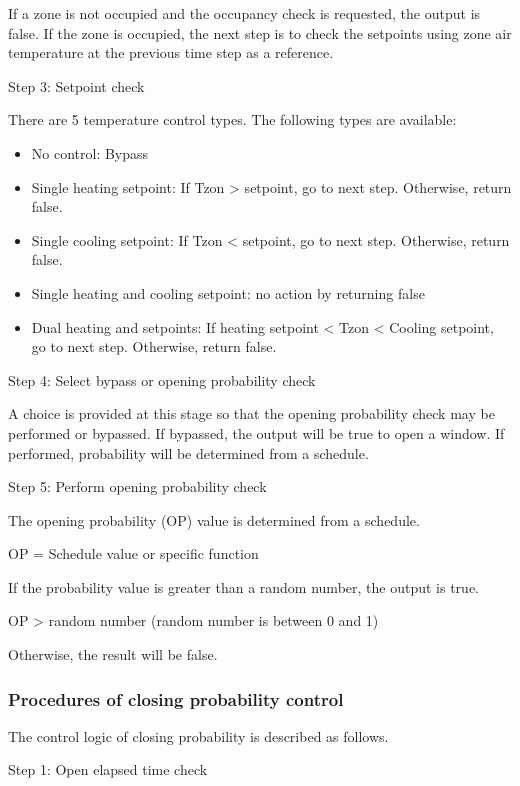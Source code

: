 If a zone is not occupied and the occupancy check is requested, the output is false. If the zone is occupied, the next step is to check the setpoints using zone air temperature at the previous time step as a reference.

Step 3: Setpoint check

There are 5 temperature control types. The following types are available:

\begin{itemize}
\item No control: Bypass
\item Single heating setpoint: If Tzon \textgreater{} setpoint, go to next step. Otherwise, return false.
\item Single cooling setpoint: If Tzon \textless{} setpoint, go to next step. Otherwise, return false.
\item Single heating and cooling setpoint: no action by returning false
\item Dual heating and setpoints: If heating setpoint \textless{} Tzon \textless{} Cooling setpoint, go to next step. Otherwise, return false.
\end{itemize}

Step 4: Select bypass or opening probability check

A choice is provided at this stage so that the opening probability check may be performed or bypassed. If bypassed, the output will be true to open a window. If performed, probability will be determined from a schedule.

Step 5: Perform opening probability check

The opening probability (OP) value is determined from a schedule.

OP = Schedule value or specific function

If the probability value is greater than a random number, the output is true.

OP \textgreater{} random number (random number is between 0 and 1)

Otherwise, the result will be false.

\subsubsection{Procedures of closing probability control}\label{procedures-of-closing-probability-control}

The control logic of closing probability is described as follows.

Step 1: Open elapsed time check


